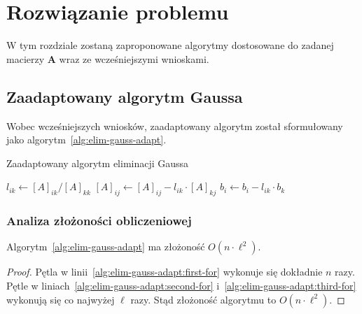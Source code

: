 \documentclass[../main.tex]{subfiles}
\newcommand{\AAA}{\mathbf{A}}
\begin{document}
  \chapter{Rozwiązanie problemu}
  W tym rozdziale zostaną zaproponowane algorytmy dostosowane 
  do zadanej macierzy \( \AAA \) wraz ze wcześniejszymi wnioskami.

  \section{Zaadaptowany algorytm Gaussa}

  Wobec wcześniejszych wniosków, zaadaptowany algorytm został sformułowany
  jako algorytm~\ref{alg:elim-gauss-adapt}.
  
  \begin{algorithm}
    \caption{Zaadaptowany algorytm eliminacji Gaussa}
    \label{alg:elim-gauss-adapt}
    \begin{algorithmic}[1]
         \label{alg:elim-gauss-adapt:first-for}
          \label{alg:elim-gauss-adapt:second-for} 
            \State $l_{ik} \gets [A]_{ik} / [A]_{kk}$ 
            \label{alg:elim-gauss-adapt:third-for}  
              \State $[A]_{ij} \gets [A]_{ij} - l_{ik} \cdot [A]_{kj}$
            \EndFor
            \State $b_i \gets b_i - l_{ik} \cdot b_k$ 
          \EndFor
        \EndFor
      \EndProcedure
    \end{algorithmic}
  \end{algorithm}

  \subsection{Analiza złożoności obliczeniowej}

  \begin{fact}
    Algorytm~\ref{alg:elim-gauss-adapt} ma złożoność \( O(n \cdot \ell^2 ) \).
  \end{fact}
  \begin{proof}
   Pętla w linii~\ref{alg:elim-gauss-adapt:first-for} wykonuje się dokładnie
    \( n \) razy. Pętle w liniach~\ref{alg:elim-gauss-adapt:second-for}  
    i~\ref{alg:elim-gauss-adapt:third-for} wykonują się co najwyżej \( \ell \)
    razy. Stąd złożoność algorytmu to \( O(n \cdot \ell^2) \).
  \end{proof}
\end{document}
